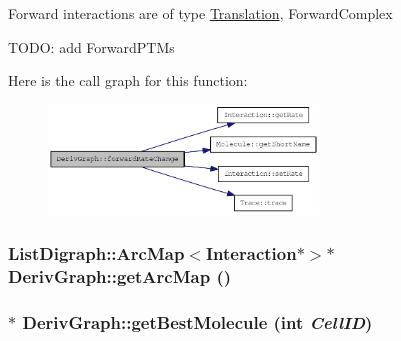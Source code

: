 Forward interactions are of type \hyperlink{classTranslation}{Translation}, ForwardComplex

TODO: add ForwardPTMs 

Here is the call graph for this function:\nopagebreak
\begin{figure}[H]
\begin{center}
\leavevmode
\includegraphics[width=203pt]{classDerivGraph_afbda567a3f51d05fad37eb46fc121a89_cgraph}
\end{center}
\end{figure}
\hypertarget{classDerivGraph_a5ff2dac34f1cdcc4b4abfc26f13da1ab}{
\subsubsection[{getArcMap}]{\setlength{\rightskip}{0pt plus 5cm}ListDigraph::ArcMap$<${\bf Interaction}$\ast$$>$$\ast$ DerivGraph::getArcMap ()}}
\label{classDerivGraph_a5ff2dac34f1cdcc4b4abfc26f13da1ab}
\hypertarget{classDerivGraph_aaaa9598e55cbd8c55585a0488e940516}{
\subsubsection[{getBestMolecule}]{ $\ast$ DerivGraph::getBestMolecule (int {\em CellID})}}
\label{classDerivGraph_aaaa9598e55cbd8c55585a0488e940516}


